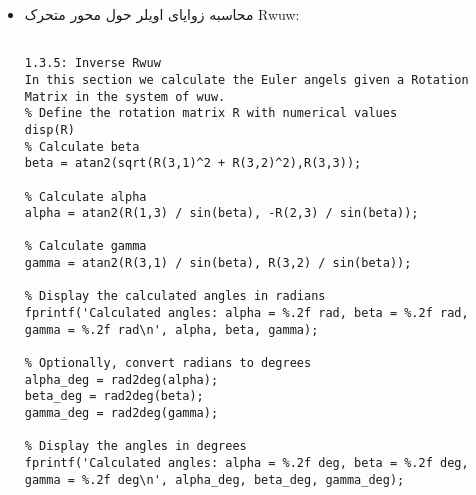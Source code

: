 \begin{enumerate}
\begin{itemize}
\begin{latin}
\begin{lstlisting}[frame=single,style=Matlab-Pyglike]
	1.3.4: Inverse Rwvw 
	In this section we calculate the Euler angels given a Rotation Matrix in the system of wvw.
	% Define the rotation matrix R with numerical values
	disp(R)
	
	% Calculate beta
	beta = atan2(sqrt(R(3,1)^2 + R(3,2)^2),R(3,3));
	
	% Calculate alpha
	alpha = atan2(R(2,3) / sin(beta), R(1,3) / sin(beta));
	
	% Calculate gamma
	gamma = atan2(R(3,2) / sin(beta), -R(3,1) / sin(beta));
	
	% Display the calculated angles in radians
	fprintf('Calculated angles: alpha = %.2f rad, beta = %.2f rad, gamma = %.2f rad\n', alpha, beta, gamma);
	
	% Optionally, convert radians to degrees
	alpha_deg = rad2deg(alpha);
	beta_deg = rad2deg(beta);
	gamma_deg = rad2deg(gamma);
	
	% Display the angles in degrees
	fprintf('Calculated angles: alpha = %.2f deg, beta = %.2f deg, gamma = %.2f deg\n', alpha_deg, beta_deg, gamma_deg);
		
	\end{lstlisting}
\end{latin}

\[
\quad \alpha = -56.06^{\circ},
\quad \beta = 58.33^{\circ},
\quad \gamma = 96.59^{\circ}
\]

\item 
محاسبه زوایای اویلر حول محور متحرک Rwuw:
\begin{latin}
	\begin{lstlisting}[frame=single,style=Matlab-Pyglike]
		
1.3.5: Inverse Rwuw 
In this section we calculate the Euler angels given a Rotation Matrix in the system of wuw.
% Define the rotation matrix R with numerical values
disp(R)
% Calculate beta
beta = atan2(sqrt(R(3,1)^2 + R(3,2)^2),R(3,3));

% Calculate alpha
alpha = atan2(R(1,3) / sin(beta), -R(2,3) / sin(beta));

% Calculate gamma
gamma = atan2(R(3,1) / sin(beta), R(3,2) / sin(beta));

% Display the calculated angles in radians
fprintf('Calculated angles: alpha = %.2f rad, beta = %.2f rad, gamma = %.2f rad\n', alpha, beta, gamma);

% Optionally, convert radians to degrees
alpha_deg = rad2deg(alpha);
beta_deg = rad2deg(beta);
gamma_deg = rad2deg(gamma);

% Display the angles in degrees
fprintf('Calculated angles: alpha = %.2f deg, beta = %.2f deg, gamma = %.2f deg\n', alpha_deg, beta_deg, gamma_deg);


\end{lstlisting}
\end{latin}
\end{itemize}
\end{enumerate}
